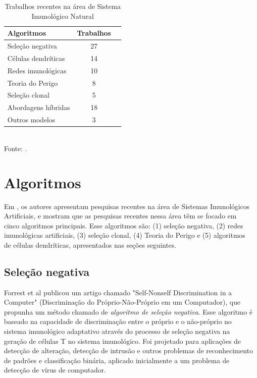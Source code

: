 \begin{table}[h!]
    \centering
    \caption{Trabalhos recentes na área de Sistema Imunológico Natural}
    \label{ais:recent}
    \begin{tabular}{l c r}
        \hline
        Algoritmos & Trabalhos   \\
        \hline
        Seleção negativa    & 27 \\
        Células dendríticas & 14 \\
        Redes imunológicas  & 10 \\
        Teoria do Perigo    & 8  \\
        Seleção clonal      & 5  \\
        Abordagens híbridas & 18 \\
        Outros modelos      & 3  \\
        \hline
    \end{tabular}
    \vspace{0.5cm}
    \\ Fonte: \citet{Dasgupta2010}.
\end{table}

\section{Algoritmos}

Em \citet{Dasgupta2010}, os autores apresentam pesquisas recentes na área de Sistemas Imunológicos Artificiais, e mostram que as pesquisas recentes nessa área têm se focado em cinco algoritmos principais. Esse algoritmos são: (1) seleção negativa, (2) redes imunológicas artificiais, (3) seleção clonal, (4) Teoria do Perigo e (5) algoritmos de células dendríticas, apresentados nas seções seguintes.

\subsection{Seleção negativa}

Forrest et al \cite{Forrest1994} publicou um artigo chamado "Self-Nonself Discrimination in a Computer" (Discriminação do Próprio-Não-Próprio em um Computador), que propunha um método chamado de \emph{algoritmo de seleção negativa}. Esse algoritmo é baseado na capacidade de discriminação entre o próprio e o não-próprio no sistema imunológico adaptativo através do processo de seleção negativa na geração de células T no sistema imunológico. Foi projetado para aplicações de detecção de alteração, detecção de intrusão e outros problemas de reconhecimento de padrões e classificação binária, aplicado inicialmente a um problema de detecção de vírus de computador.

